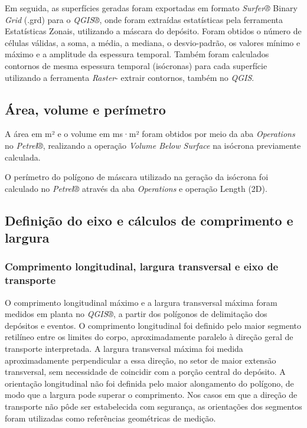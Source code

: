 Em seguida, as superfícies geradas foram exportadas em formato \textit{Surfer®} Binary \textit{Grid} (.grd) para o \textit{QGIS®}, onde foram extraídas estatísticas pela ferramenta Estatísticas Zonais, utilizando a máscara do depósito. Foram obtidos o número de células válidas, a soma, a média, a mediana, o desvio-padrão, os valores mínimo e máximo e a amplitude da espessura temporal. Também foram calculados contornos de mesma espessura temporal (isócronas) para cada superfície utilizando a ferramenta \textit{\textit{Raster}}- extrair contornos, também no \textit{QGIS}.

\subsection{Área, volume e perímetro}\label{sec:4-3-2}

A área em m² e o volume em ms·m² foram obtidos por meio da aba \textit{Operations} no \textit{Petrel®}, realizando a operação \textit{Volume Below Surface} na isócrona previamente calculada.

O perímetro do polígono de máscara utilizado na geração da isócrona foi calculado no \textit{Petrel®} através da aba \textit{Operations} e operação Length (2D).

\subsection{Definição do eixo e cálculos de comprimento e largura}\label{sec:4-3-3}

\subsubsection{Comprimento longitudinal, largura transversal e eixo de transporte}\label{sec:4-3-3-1}

O comprimento longitudinal máximo e a largura transversal máxima foram medidos em planta no \textit{QGIS®}, a partir dos polígonos de delimitação dos depósitos e eventos. O comprimento longitudinal foi definido pelo maior segmento retilíneo entre os limites do corpo, aproximadamente paralelo à direção geral de transporte interpretada. A largura transversal máxima foi medida aproximadamente perpendicular a essa direção, no setor de maior extensão transversal, sem necessidade de coincidir com a porção central do depósito. A orientação longitudinal não foi definida pelo maior alongamento do polígono, de modo que a largura pode superar o comprimento. Nos casos em que a direção de transporte não pôde ser estabelecida com segurança, as orientações dos segmentos foram utilizadas como referências geométricas de medição.

